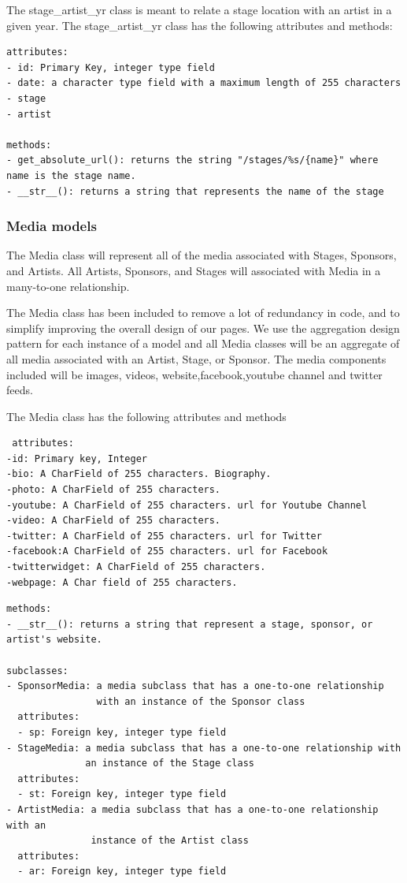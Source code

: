 \documentclass[12pt,english]{scrartcl}
\begin{document}
The stage\_artist\_yr class is meant to relate a stage location with an artist in a given year.
The stage\_artist\_yr class has the following attributes and methods:
\begin{verbatim}
attributes:
- id: Primary Key, integer type field
- date: a character type field with a maximum length of 255 characters
- stage
- artist

methods:
- get_absolute_url(): returns the string "/stages/%s/{name}" where name is the stage name.
- __str__(): returns a string that represents the name of the stage
\end{verbatim}


\subsubsection{Media models}

The Media class will represent all of the media associated with Stages, Sponsors, and Artists. All Artists, Sponsors, and Stages will associated
with Media in a many-to-one relationship.

The Media class has been included to remove a lot of redundancy in code, and to simplify improving the overall 
design of our pages. We use the aggregation design pattern for each instance of a model and all Media classes will be an aggregate of all media
associated with an Artist, Stage, or Sponsor. The media components included will be images, videos, website,facebook,youtube channel and twitter feeds.

The Media class has the following attributes and methods
\begin{verbatim}
 attributes:
-id: Primary key, Integer
-bio: A CharField of 255 characters. Biography. 
-photo: A CharField of 255 characters. 
-youtube: A CharField of 255 characters. url for Youtube Channel
-video: A CharField of 255 characters.
-twitter: A CharField of 255 characters. url for Twitter
-facebook:A CharField of 255 characters. url for Facebook
-twitterwidget: A CharField of 255 characters.
-webpage: A Char field of 255 characters.
\end{verbatim}

\begin{verbatim}
methods:
- __str__(): returns a string that represent a stage, sponsor, or artist's website.

subclasses:
- SponsorMedia: a media subclass that has a one-to-one relationship 
                with an instance of the Sponsor class
  attributes:
  - sp: Foreign key, integer type field
- StageMedia: a media subclass that has a one-to-one relationship with 
              an instance of the Stage class
  attributes:
  - st: Foreign key, integer type field
- ArtistMedia: a media subclass that has a one-to-one relationship with an
               instance of the Artist class
  attributes:
  - ar: Foreign key, integer type field
  
\end{verbatim}
\end{document}
